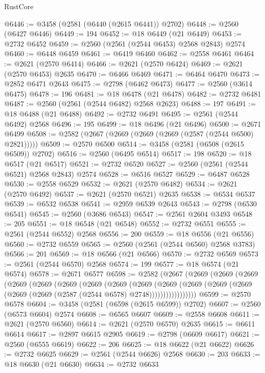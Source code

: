 \begin{lexlean}{RustCore}
\begin{coremodule}
@6446 := @3458 (@2581 (@6440 (@2615 @6441)) @2702)
@6448 := @2560 (@6427 @6446)
@6449 := 194
@6452 := @18 @6449 (@21 @6449)
@6453 := @2732 @6452
@6459 := @2560 (@2561 (@2544 @6453) @2568 @2843) @2574
@6460 := @6448 @6459
@6461 := @6419 @6460
@6462 := @2558 @6461
@6464 := @2621 (@2570 @6414)
@6466 := @2621 (@2570 @6424)
@6469 := @2621 (@2570 @6453) @2635
@6470 := @6466 @6469
@6471 := @6464 @6470
@6473 := @2852 @6471 @2643
@6475 := @2798 (@6462 @6473)
@6477 := @2560 (@3614 @6475)
@6478 := 196
@6481 := @18 @6478 (@21 @6478)
@6482 := @2732 @6481
@6487 := @2560 (@2561 (@2544 @6482) @2568 @2623)
@6488 := 197
@6491 := @18 @6488 (@21 @6488)
@6492 := @2732 @6491
@6495 := @2561 (@2544 @6492) @2568
@6496 := 195
@6499 := @18 @6496 (@21 @6496)
@6500 := @2671 @6499
@6508 := @2582 (@2667 (@2669 (@2669 (@2669 (@2587 (@2544 @6500) @2821)))))
@6509 := @2570 @6500
@6514 := @3458 (@2581 (@6508 (@2615 @6509)) @2702)
@6516 := @2560 (@6495 @6514)
@6517 := 198
@6520 := @18 @6517 (@21 @6517)
@6521 := @2732 @6520
@6527 := @2560 (@2561 (@2544 @6521) @2568 @2843) @2574
@6528 := @6516 @6527
@6529 := @6487 @6528
@6530 := @2558 @6529
@6532 := @2621 (@2570 @6482)
@6534 := @2621 (@2570 @6492)
@6537 := @2621 (@2570 @6521) @2635
@6538 := @6534 @6537
@6539 := @6532 @6538
@6541 := @2959 @6539 @2643
@6543 := @2798 (@6530 @6541)
@6545 := @2560 (@3686 @6543)
@6547 := @2561 @2604 @3493
@6548 := 205
@6551 := @18 @6548 (@21 @6548)
@6552 := @2732 @6551
@6555 := @2561 (@2544 @6552) @2568
@6556 := 200
@6559 := @18 @6556 (@21 @6556)
@6560 := @2732 @6559
@6565 := @2560 (@2561 (@2544 @6560) @2568 @3783)
@6566 := 201
@6569 := @18 @6566 (@21 @6566)
@6570 := @2732 @6569
@6573 := @2561 (@2544 @6570) @2568
@6574 := 199
@6577 := @18 @6574 (@21 @6574)
@6578 := @2671 @6577
@6598 := @2582
    (@2667
      (@2669
        (@2669
          (@2669
            (@2669
              (@2669
                (@2669
                  (@2669
                    (@2669
                      (@2669
                        (@2669
                          (@2669
                            (@2669 (@2669 (@2669 (@2669 (@2587 (@2544 @6578) @2748)))))))))))))))))
@6599 := @2570 @6578
@6604 := @3458 (@2581 (@6598 (@2615 @6599)) @2702)
@6607 := @2560 (@6573 @6604) @2574
@6608 := @6565 @6607
@6609 := @2558 @6608
@6611 := @2621 (@2570 @6560)
@6614 := @2621 (@2570 @6570) @2635
@6615 := @6611 @6614
@6617 := @2897 @6615 @2905
@6619 := @2798 (@6609 @6617)
@6621 := @2560 (@6555 @6619)
@6622 := 206
@6625 := @18 @6622 (@21 @6622)
@6626 := @2732 @6625
@6629 := @2561 (@2544 @6626) @2568
@6630 := 203
@6633 := @18 @6630 (@21 @6630)
@6634 := @2732 @6633

\end{coremodule}
\end{lexlean}
